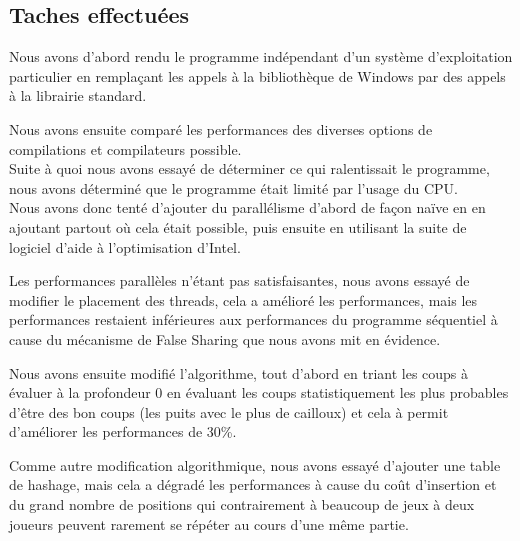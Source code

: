 \documentclass[
 aip,
 jmp,
 amsmath,amssymb,
 reprint
]{revtex4-1}
\begin{document}
\subsection{Taches effectuées}
Nous avons d'abord rendu le programme indépendant d'un système d'exploitation particulier en remplaçant les appels à la  bibliothèque de Windows par des appels à la librairie standard.\par
Nous avons ensuite comparé les performances des diverses options de compilations et compilateurs possible.\\
Suite à quoi nous avons essayé de déterminer ce qui ralentissait le programme, nous avons déterminé que le programme était limité par l'usage du CPU.\\
Nous avons donc tenté d'ajouter du parallélisme d'abord de façon naïve en en ajoutant partout où cela était possible, puis ensuite en utilisant la suite de logiciel d'aide à l'optimisation d'Intel.\par
Les performances parallèles n'étant pas satisfaisantes, nous avons essayé de modifier le placement des threads, cela a amélioré les performances, mais les performances restaient inférieures aux performances du programme séquentiel à cause du mécanisme de False Sharing\pageref{Fig:false_sharing} que nous avons mit en évidence.\par
Nous avons ensuite modifié l'algorithme, tout d'abord en triant les coups à évaluer à la profondeur 0 en évaluant les coups statistiquement les plus probables d'être des bon coups (les puits avec le plus de cailloux) et cela à permit d'améliorer les performances de 30\%.\par
Comme autre modification algorithmique, nous avons essayé d'ajouter une table de hashage, mais cela a dégradé les performances à cause du coût d'insertion et du grand nombre de positions qui contrairement à beaucoup de jeux à deux joueurs peuvent rarement se répéter au cours d'une même partie.
\end{document}
